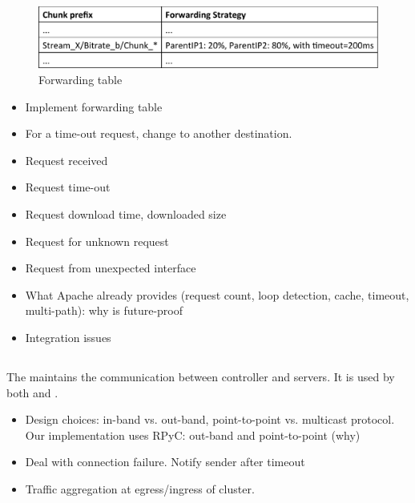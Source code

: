 \begin{figure}[h]
\centering
\includegraphics[width=1.0\columnwidth]{figures/forwarding-table-format.pdf}
\caption{Forwarding table}
\label{fig:forwarding-table}
\end{figure}

\begin{itemize}
	\item Implement forwarding table
	\item For a time-out request, change to another destination.
\end{itemize}

\begin{itemize}
	\item Request received
	\item Request time-out
	\item Request download time, downloaded size
	\item Request for unknown request
	\item Request from unexpected interface
\end{itemize}

\begin{itemize}
	\item What Apache already provides (request count, loop detection, cache, timeout, multi-path): why is future-proof
	\item Integration issues
\end{itemize}



\subsection{\Dissemination}

The \dissemination maintains the communication between controller and servers. It is used by both \discovery and \decision. 

\begin{itemize}
	\item Design choices: in-band vs. out-band, point-to-point vs. multicast protocol. Our implementation uses RPyC: out-band and point-to-point (why)
	\item Deal with connection failure. Notify sender after timeout
	\item Traffic aggregation at egress/ingress of cluster. 
\end{itemize}


